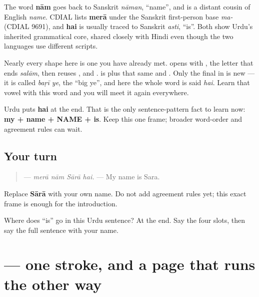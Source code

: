 The word \textbf{nām} goes back to Sanskrit \emph{nāman}, \textquotedblleft{}name\textquotedblright{}, and is a distant cousin of English \emph{name}. CDIAL lists \textbf{merā} under the Sanskrit first-person base \emph{ma-} (CDIAL 9691), and \textbf{hai} is usually traced to Sanskrit \emph{asti}, \textquotedblleft{}is\textquotedblright{}. Both show Urdu's inherited grammatical core, shared closely with Hindi even though the two languages use different scripts.

Nearly every shape here is one you have already met. \textbf{} opens with \textbf{}, the letter that ends \emph{salām}, then reuses \textbf{}, \textbf{} and \textbf{}. \textbf{} is \textbf{} plus that same \textbf{} and \textbf{}. Only the final \textbf{} in \textbf{} is new — it is called \emph{baṛī ye}, the \textquotedblleft{}big ye\textquotedblright{}, and here the whole word is said \emph{hai}. Learn that vowel with this word and you will meet it again everywhere.

\begin{grammarlens}[title={Grammar Lens: the verb waits}]
Urdu puts \textbf{hai} at the end. That is the only sentence-pattern fact to learn now: \textbf{my + name + NAME + is}. Keep this one frame; broader word-order and agreement rules can wait.
\end{grammarlens}

\subsection*{Your turn}
\begin{quote}
\textbf{   } — \emph{merā nām Sārā hai.} — My name is Sara.
\end{quote}

Replace \textbf{Sārā} with your own name. Do not add agreement rules yet; this exact frame is enough for the introduction.

\begin{tcolorbox}[breakable,colback=teal!4,colframe=teal!35!black,title={Before you move on}]
Where does “is” go in this Urdu sentence? At the end. Say the four slots, then say the full sentence with your name.
\end{tcolorbox}
\section[\texorpdfstring{\ur{ا} (alif)}{ا (alif)}]{ — one stroke, and a page that runs the other way}

